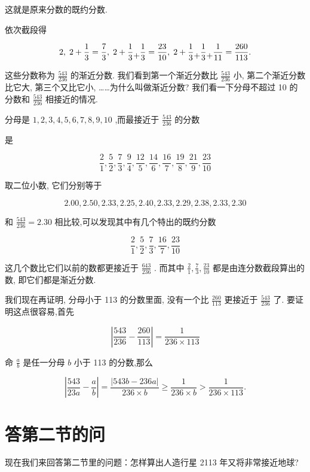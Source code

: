 \documentclass{ctexart}
\newcommand{\cplus}{\raisebox{-1ex}{+}}
\begin{document}
这就是原来分数的既约分数.

依次截段得

\[
2,\;2 + \frac{1}{3} = \frac{7}{3},\;2 + \frac{1}{3} \cplus \frac{1}{3} = \frac{23}{10},\;2 + \frac{1}{3} \cplus \frac{1}{3} \cplus \frac{1}{11} = \frac{260}{113}.
\]

这些分数称为 \(\frac{543}{236}\) 的渐近分数. 我们看到第一个渐近分数比 \(\frac{543}{236}\) 小, 第二个渐近分数比它大, 第三个又比它小, ……为什么叫做渐近分数? 我们看一下分母不超过 10 的分数和 \(\frac{543}{236}\) 相接近的情况.

分母是 \(1,2,3,4,5,6,7,8,9,{10}\) ,而最接近于 \(\frac{543}{236}\) 的分数

是

\[
\frac{2}{1},\frac{5}{2},\frac{7}{3},\frac{9}{4},\frac{12}{5},\frac{14}{6},\frac{16}{7},\frac{19}{8},\frac{21}{9},\frac{23}{10}
\]

取二位小数, 它们分别等于

\[{2.00},{2.50},{2.33},{2.25},{2.40},{2.33},{2.29},{2.38},{2.33},{2.30}\]

和 \(\frac{543}{236} = {2.30}\) 相比较,可以发现其中有几个特出的既约分数

\[
\frac{2}{1},\frac{5}{2},\frac{7}{3},\frac{16}{7},\frac{23}{10}
\]

这几个数比它们以前的数都更接近于 \(\frac{643}{236}\) . 而其中 \(\frac{2}{1},\frac{7}{3},\frac{23}{10}\) 都是由连分数截段算出的数, 即它们都是渐近分数.

我们现在再证明, 分母小于 113 的分数里面, 没有一个比 \(\frac{260}{113}\) 更接近于 \(\frac{543}{236}\) 了. 要证明这点很容易,首先

\[
\left| {\frac{543}{236} - \frac{260}{113}}\right| = \frac{1}{{236} \times {113}}
\]

命 \(\frac{a}{b}\) 是任一分母 \(b\) 小于 113 的分数,那么

\[
\left| {\frac{543}{23a} - \frac{a}{b}}\right| = \frac{\left| {543}b - {236}a\right| }{{236} \times b} \geq \frac{1}{{236} \times b} > \frac{1}{{236} \times {113}}.
\]

\section{答第二节的问}

现在我们来回答第二节里的问题：怎样算出人造行星 2113 年又将非常接近地球?
\end{document}
